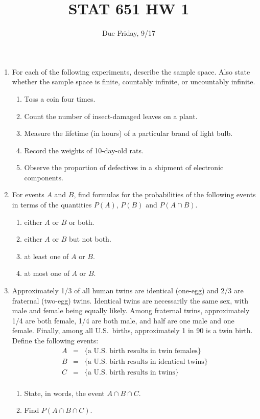 \documentclass[12pt]{article}
\begin{document}
\title{STAT 651 HW 1}
\author{Due Friday, 9/17}
\date{}
\maketitle

\begin{enumerate}
\item
For each of the following experiments, describe the sample space.
Also state whether the sample space is finite, countably infinite, or uncountably infinite.
\begin{enumerate}
\item Toss a coin four times.
\item Count the number of insect-damaged leaves on a plant.
\item Measure the lifetime (in hours) of a particular brand of light bulb.
\item Record the weights of 10-day-old rats.
\item Observe the proportion of defectives in a shipment of electronic components.
\end{enumerate}

\item
For events $A$ and $B$, find formulas for the probabilities of the following
events in terms of the quantities $P(A)$, $P(B)$ and $P(A\cap B)$.
\begin{enumerate}
\item either $A$ or $B$ or both.
\item either $A$ or $B$ but not both.
\item at least one of $A$ or $B$.
\item at most one of $A$ or $B$.
\end{enumerate}

\item
Approximately 1/3 of all human twins are identical (one-egg) and
2/3 are fraternal (two-egg) twins.  Identical twins are necessarily the same sex,
with male and female being equally likely.  Among fraternal twins, approximately 1/4 are
both female, 1/4 are both male, and half are one male and one female.  Finally,
among all U.S.\ births, approximately 1 in 90 is a twin birth.  Define the following
events:
\[
\begin{array}{rcl}
A & = & {\mbox{\{a U.S.\ birth results in twin females\}}} \\
B & = & {\mbox{\{a U.S.\ birth results in identical twins\}}} \\
C & = & {\mbox{\{a U.S.\ birth results in twins\}}} \\
\end{array}
\]
\begin{enumerate}
\item State, in words, the event $A \cap B \cap C$.
\item Find $P(A\cap B \cap C)$.
\end{enumerate}


\end{enumerate}
\end{document}

